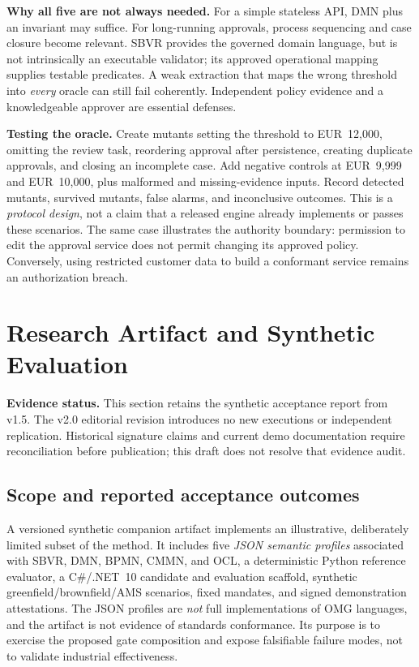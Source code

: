 \documentclass[11pt,a4paper]{article}
\begin{document}
\textbf{Why all five are not always needed.} For a simple stateless API, DMN plus an invariant may suffice. For long-running approvals, process sequencing and case closure become relevant. SBVR provides the governed domain language, but is not intrinsically an executable validator; its approved operational mapping supplies testable predicates. A weak extraction that maps the wrong threshold into \emph{every} oracle can still fail coherently. Independent policy evidence and a knowledgeable approver are essential defenses.

\textbf{Testing the oracle.} Create mutants setting the threshold to EUR~12,000, omitting the review task, reordering approval after persistence, creating duplicate approvals, and closing an incomplete case. Add negative controls at EUR~9,999 and EUR~10,000, plus malformed and missing-evidence inputs. Record detected mutants, survived mutants, false alarms, and inconclusive outcomes. This is a \emph{protocol design}, not a claim that a released engine already implements or passes these scenarios.
The same case illustrates the authority boundary: permission to edit the approval service does not permit changing its approved policy. Conversely, using restricted customer data to build a conformant service remains an authorization breach.

\section{Research Artifact and Synthetic Evaluation}
\textbf{Evidence status.} This section retains the synthetic acceptance report from v1.5. The v2.0 editorial revision introduces no new executions or independent replication. Historical signature claims and current demo documentation require reconciliation before publication; this draft does not resolve that evidence audit.

\subsection{Scope and reported acceptance outcomes}
A versioned synthetic companion artifact implements an illustrative, deliberately limited subset of the method. It includes five \emph{JSON semantic profiles} associated with SBVR, DMN, BPMN, CMMN, and OCL, a deterministic Python reference evaluator, a C\#/.NET~10 candidate and evaluation scaffold, synthetic greenfield/brownfield/AMS scenarios, fixed mandates, and signed demonstration attestations. The JSON profiles are \emph{not} full implementations of OMG languages, and the artifact is not evidence of standards conformance. Its purpose is to exercise the proposed gate composition and expose falsifiable failure modes, not to validate industrial effectiveness.
\end{document}
